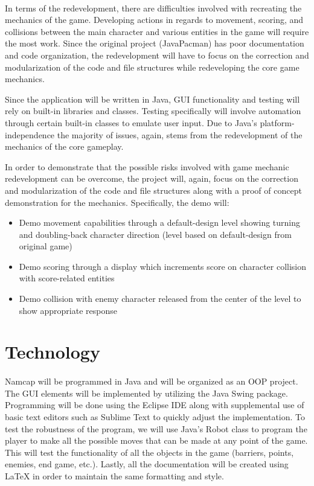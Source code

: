 \documentclass{article}
\begin{document}
\paragraph{}
In terms of the redevelopment, there are difficulties involved with recreating the mechanics of the game. Developing actions in regards to movement, scoring, and collisions between the main character and various entities in the game will require the most work. Since the original project (JavaPacman) has poor documentation and code organization, the redevelopment will have to focus on the correction and modularization of the code and file structures while redeveloping the core game mechanics.\par Since the application will be written in Java, GUI functionality and testing will rely on built-in libraries and classes. Testing specifically will involve automation through certain built-in classes to emulate user input. Due to Java's platform-independence the majority of issues, again, stems from the redevelopment of the mechanics of the core gameplay.\par In order to demonstrate that the possible risks involved with game mechanic redevelopment can be overcome, the project will, again, focus on the correction and modularization of the code and file structures along with a proof of concept demonstration for the mechanics. Specifically, the demo will:
\begin{itemize}
\item Demo movement capabilities through a default-design level showing turning and doubling-back character direction (level based on default-design from original game)
\item Demo scoring through a display which increments score on character collision with score-related entities
\item Demo collision with enemy character released from the center of the level to show appropriate response
\end{itemize}

\section{Technology}

\paragraph{}
Namcap will be programmed in Java and will be organized as an OOP project. The GUI elements will be implemented by utilizing the Java Swing package. Programming will be done using the Eclipse IDE along with supplemental use of basic text editors such as Sublime Text to quickly adjust the implementation. To test the robustness of the program, we will use Java's Robot class to program the player to make all the possible moves that can be made at any point of the game. This will test the functionality of all the objects in the game (barriers, points, enemies, end game, etc.). Lastly, all the documentation will be created using LaTeX in order to maintain the same formatting and style.
\end{document}
